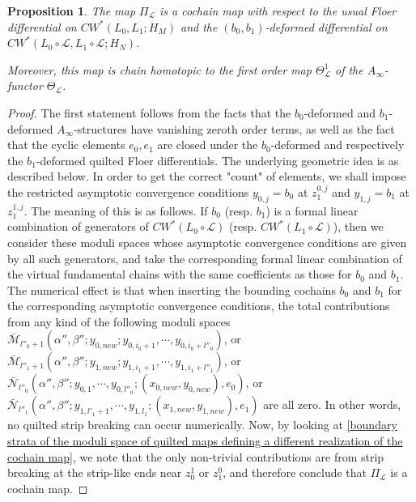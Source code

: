 \documentclass{amsart}
\newtheorem{proposition}[theorem]{Proposition}
\numberwithin{equation}{section}
\numberwithin{figure}{section}
\begin{document}
\begin{proposition}
	The map $\Pi_{\mathcal{L}}$ is a cochain map with respect to the usual Floer differential on $CW^{*}(L_{0}, L_{1}; H_{M})$ and the $(b_{0}, b_{1})$-deformed differential on $CW^{*}(L_{0} \circ \mathcal{L}, L_{1} \circ \mathcal{L}; H_{N})$. \par	
	Moreover, this map is chain homotopic to the first order map $\Theta_{\mathcal{L}}^{1}$ of the $A_{\infty}$-functor $\Theta_{\mathcal{L}}$.
\end{proposition}
\begin{proof}
	The first statement follows from the facts that the $b_{0}$-deformed and $b_{1}$-deformed $A_{\infty}$-structures have vanishing zeroth order terms, as well as the fact that the cyclic elements $e_{0}, e_{1}$ are closed under the $b_{0}$-deformed and respectively the $b_{1}$-deformed quilted Floer differentials. The underlying geometric idea is as described below. In order to get the correct "count" of elements, we shall impose the restricted asymptotic convergence conditions $y_{0, j} = b_{0}$ at $z_{1}^{0, j}$ and $y_{1, j} = b_{1}$ at $z_{1}^{1, j}$. The meaning of this is as follows. If $b_{0}$ (resp. $b_{1}$) is a formal linear combination of generators of $CW^{*}(L_{0} \circ \mathcal{L})$ (resp. $CW^{*}(L_{1} \circ \mathcal{L})$), then we consider these moduli spaces whose asymptotic convergence conditions are given by all such generators, and take the corresponding formal linear combination of the virtual fundamental chains with the same coefficients as those for $b_{0}$ and $b_{1}$. The numerical effect is that when inserting the bounding cochains $b_{0}$ and $b_{1}$ for the corresponding asymptotic convergence conditions, the total contributions from any kind of the following moduli spaces $\bar{\mathcal{M}}_{l''_{0}+1}(\alpha'', \beta''; y_{0, new}; y_{0, i_{0} + 1}, \cdots, y_{0, i_{0} + l''_{0}})$, or $\bar{\mathcal{M}}_{l''_{1}+1}(\alpha'', \beta''; y_{1, new}; y_{1, i_{1}+1}, \cdots, y_{1, i_{1}+l''_{1}})$, or $\bar{\mathcal{N}}_{l''_{0}}(\alpha'', \beta''; y_{0, 1}, \cdots, y_{0, l''_{0}}; (x_{0, new}, y_{0, new}), e_{0})$, or $\bar{\mathcal{N}}_{l''_{1}}(\alpha'', \beta''; y_{1, l'_{1}+1}, \cdots, y_{1, l_{1}}; (x_{1, new}, y_{1, new}), e_{1})$ are all zero. In other words, no quilted strip breaking can occur numerically. Now, by looking at \eqref{boundary strata of the moduli space of quilted maps defining a different realization of the cochain map}, we note that the only non-trivial contributions are from strip breaking at the strip-like ends near $z_{0}^{1}$ or $z_{1}^{0}$, and therefore conclude that $\Pi_{\mathcal{L}}$ is a cochain map. \par

\end{proof}
\end{document}
